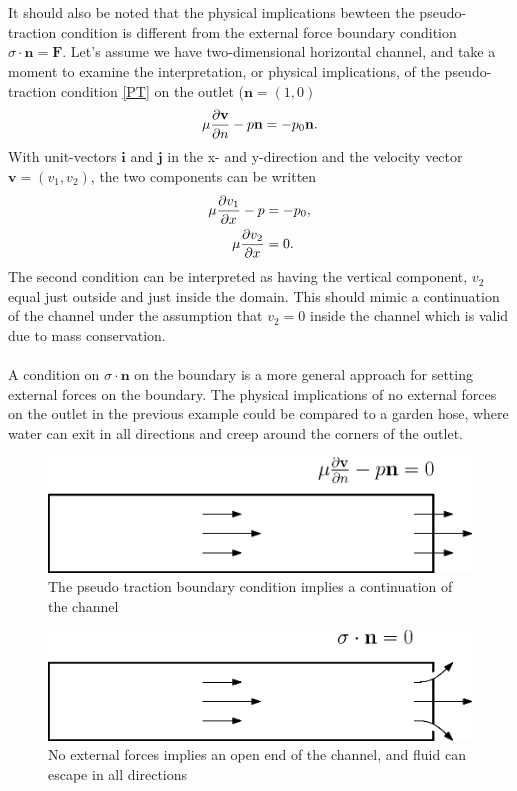 \\
\\
It should also be noted that the physical implications bewteen the pseudo-traction condition is different from the external force boundary condition $\sigma \cdot \mathbf{n} = \mathbf{F}$. Let's assume we have two-dimensional horizontal channel, and take a moment to examine the interpretation, or physical implications, of the pseudo-traction condition \eqref{PT} on the outlet ($\mathbf{n} = (1,0)$
\begin{align}
\mu \frac{\partial \mathbf{v}}{\partial n} - p\mathbf{n} = -p_0\mathbf{n}.
\end{align}
With unit-vectors $\mathbf{i}$ and $\mathbf{j}$ in the x- and y-direction and the velocity vector $\mathbf{v} = (v_1, v_2)$, the two components can be written
\begin{align}
\mu \frac{\partial v_1}{\partial x} - p & = -p_0, \\
\mu \frac{\partial v_2}{\partial x} & = 0.
\end{align}
The second condition can be interpreted as having the vertical component, $v_2$ equal just outside and just inside the domain. This should mimic a continuation of the channel under the assumption that $v_2 = 0$ inside the channel which is valid due to mass conservation.  
\\
\\
A condition on $\sigma \cdot \mathbf{n}$ on the boundary is a more general approach for setting external forces on the boundary. The physical implications of no external forces on the outlet in the previous example could be compared to a garden hose, where water can exit in all directions and creep around the corners of the outlet. 
\begin{center}
\begin{figure}[!h]
\includegraphics{figures/Pseudo_traction}
\caption{The pseudo traction boundary condition implies a continuation of the channel}
\label{fig:Pseudo_traction}
\end{figure}
\begin{figure}
\includegraphics{figures/Boundary_force}
\caption{No external forces implies an open end of the channel, and fluid can escape in all directions}
\label{fig:Boundary_force}
\end{figure}
\end{center}
\clearpage
